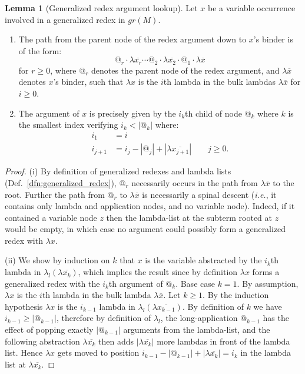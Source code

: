 \documentclass{article}
\makeatletter
\theoremstyle{definition}
\newtheorem{lemma}{Lemma}[section]
\newcommand\Nodes{\mathcal{N}}%
\newcommand\NodesApp{\Nodes_@}%
\renewcommand\ie{{\it i.e.\@\xspace}}
\makeatother
\begin{document}
\begin{lemma}[Generalized redex argument lookup]
\label{lemma:genredex_lookup}
Let $x$ be a variable occurrence involved in a generalized redex in $gr(M)$.
\begin{enumerate}[label=(\roman*)]
    \item The path from the parent node of the redex argument down to $x$'s binder is of the form:
$$ @_r \cdot \lambda\overline{x_r} \cdots
@_2 \cdot \lambda\overline{x_2} \cdot @_1 \cdot \lambda\overline{x}$$
for $r\geq0$, where $@_r$ denotes the parent node of the redex argument, and $\lambda\overline{x}$ denotes $x$'s binder, such that $\lambda x$ is the $i$th lambda in the bulk lambdas $\lambda\overline{x}$ for $i\geq0$.

\item The argument of $x$ is precisely given by the $i_k$th child of node $@_k$ where $k$ is the smallest index verifying $i_k<|@_k|$ where:
\begin{align*}
    i_1 &= i \\
    i_{j+1} &= i_j - |@_j| + |\lambda\overline{x_{j+1}}| \qquad j\geq 0 .
\end{align*}
\end{enumerate}
\end{lemma}
\begin{proof}
(i) By definition of generalized redexes and lambda lists (Def.~\ref{dfn:generalized_redex}), $@_r$ necessarily occurs in the path from $\lambda\overline{x}$ to the root. Further the path from $@_r$ to $\lambda\overline{x}$ is necessarily a spinal descent (\ie, it contains only lambda and application nodes, and no variable node). Indeed, if it contained a variable node $z$ then the lambda-list at the subterm rooted at $z$ would be empty, in which case no argument could possibly form a generalized redex with $\lambda x$.

(ii) We show by induction on $k$ that $x$ is the variable abstracted by the $i_k$th lambda in $\lambda_l(\lambda\overline{x_k})$, which implies the result since by definition $\lambda x$ forms a generalized redex with the $i_k$th argument of $@_k$.
Base case $k=1$. By assumption, $\lambda x$ is the $i$th lambda in the bulk lambda $\lambda\overline{x}$. Let $k\geq 1$. By the induction hypothesis $\lambda x$ is the $i_{k-1}$ lambda in $\lambda_l(\lambda\overline{x_{k-1}})$.
By definition of $k$ we have $i_{k-1}\geq|@_{k-1}|$, therefore by definition of $\lambda_l$, the long-application $@_{k-1}$ has the effect of popping exactly $|@_{k-1}|$ arguments from the lambda-list, and the following abstraction $\lambda\overline{x_k}$ then adds $|\lambda\overline{x_k}|$ more lambdas in front of the lambda list. Hence $\lambda x$ gets moved to position $i_{k-1} - |@_{k-1}| + |\lambda\overline{x_k}| = i_k$ in the lambda list at $\lambda\overline{x_k}$.
\end{proof}
\end{document}
